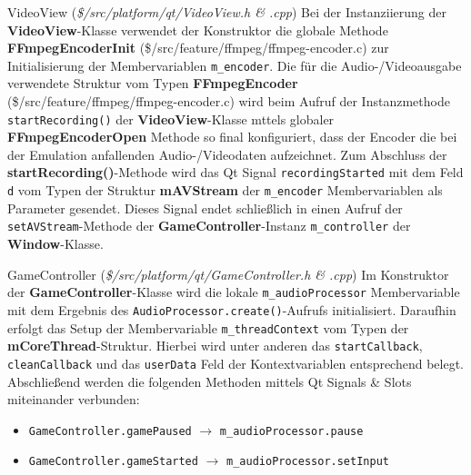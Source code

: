 \documentclass[11pt,a4paper]{scrartcl}
\newcommand{\AutorDominik} {
    \vspace{-4mm}
    \large \textbf{Autor:} Dominik Scharnagl \normalsize
    \vspace{2mm}
}
\begin{document}
\vspace{5mm}
\large VideoView \normalsize(\textit{\$/src/platform/qt/VideoView.h \& .cpp})
\vspace{2mm}\newline
Bei der Instanziierung der \textbf{VideoView}-Klasse verwendet der Konstruktor die globale Methode \textbf{FFmpegEncoderInit} (\$/src/feature/ffmpeg/ffmpeg-encoder.c) zur Initialisierung der Membervariablen \verb|m_encoder|. Die f\"ur die Audio-/Videoausgabe verwendete Struktur vom Typen \textbf{FFmpegEncoder} (\$/src/feature/ffmpeg/ffmpeg-encoder.c) wird beim Aufruf der Instanzmethode \verb|startRecording()| der \textbf{VideoView}-Klasse mttels globaler \textbf{FFmpegEncoderOpen} Methode so final konfiguriert, dass der Encoder die bei der Emulation anfallenden Audio-/Videodaten aufzeichnet. Zum Abschluss der \textbf{startRecording()}-Methode wird das Qt Signal \verb|recordingStarted| mit dem Feld \verb|d| vom Typen der Struktur \textbf{mAVStream} der \verb|m_encoder| Membervariablen als Parameter gesendet. Dieses Signal endet schlie{\ss}lich in einen Aufruf der \verb|setAVStream|-Methode der \textbf{GameController}-Instanz \verb|m_controller| der \textbf{Window}-Klasse.

\vspace{5mm}
\large GameController \normalsize(\textit{\$/src/platform/qt/GameController.h \& .cpp})
\vspace{2mm}\newline
Im Konstruktor der \textbf{GameController}-Klasse wird die lokale \verb|m_audioProcessor| Membervariable mit dem Ergebnis des \verb|AudioProcessor.create()|-Aufrufs initialisiert. Daraufhin erfolgt das Setup der Membervariable \verb|m_threadContext| vom Typen der \textbf{mCoreThread}-Struktur. Hierbei wird unter anderen das \verb|startCallback|, \verb|cleanCallback| und das \verb|userData| Feld der Kontextvariablen entsprechend belegt. Abschlie{\ss}end werden die folgenden Methoden mittels Qt Signals \& Slots miteinander verbunden:

\begin{itemize}
    \item \verb|GameController.gamePaused| $\rightarrow$ \verb|m_audioProcessor.pause|
    \item \verb|GameController.gameStarted| $\rightarrow$ \verb|m_audioProcessor.setInput|
\end{itemize}


\end{document}
